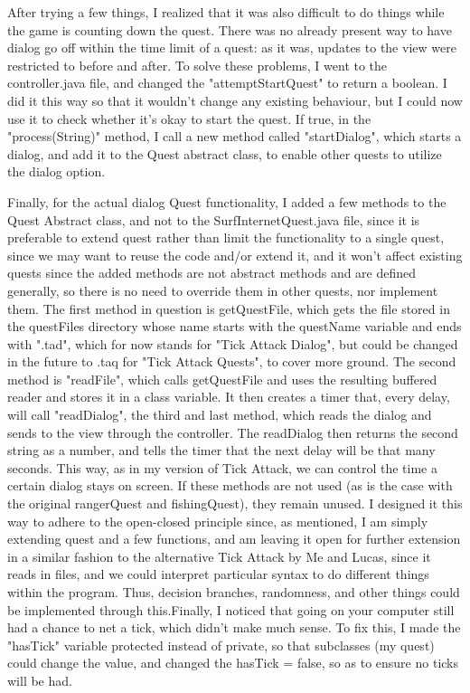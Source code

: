 \documentclass[letter paper, 12pt]{article}
\begin{document}
After trying a few things, I realized that it was also difficult to do things while the game is counting down the quest. There was no already present way to have dialog go off within the time limit of a quest: as it was, updates to the view were restricted to before and after. To solve these problems, I went to the controller.java file, and changed the "attemptStartQuest" to return a boolean. I did it this way so that it wouldn't change any existing behaviour, but I could now use it to check whether it's okay to start the quest. If true, in the "process(String)" method, I call a new method called "startDialog", which starts a dialog, and add it to the Quest abstract class, to enable other quests to utilize the dialog option.\newline

Finally, for the actual dialog Quest functionality, I added a few methods to the Quest Abstract class, and not to the SurfInternetQuest.java file, since it is preferable to extend quest rather than limit the functionality to a single quest, since we may want to reuse the code and/or extend it, and it won't affect existing quests since the added methods are not abstract methods and are defined generally, so there is no need to override them in other quests, nor implement them. The first method in question is getQuestFile, which gets the file stored in the questFiles directory whose name starts with the questName variable and ends with ".tad", which for now stands for "Tick Attack Dialog", but could be changed in the future to .taq for "Tick Attack Quests", to cover more ground. The second method is "readFile", which calls getQuestFile and uses the resulting buffered reader and stores it in a class variable. It then creates a timer that, every delay, will call "readDialog", the third and last method, which reads the dialog and sends to the view through the controller. The readDialog then returns the second string as a number, and tells the timer that the next delay will be that many seconds. This way, as in my version of Tick Attack, we can control the time a certain dialog stays on screen. If these methods are not used (as is the case with the original rangerQuest and fishingQuest), they remain unused. I designed it this way to adhere to the open-closed principle since, as mentioned, I am simply extending quest and a few functions, and am leaving it open for further extension in a similar fashion to the alternative Tick Attack by Me and Lucas, since it reads in files, and we could interpret particular syntax to do different things within the program. Thus, decision branches, randomness, and other things could be implemented through this.Finally, I noticed that going on your computer still had a chance to net a tick, which didn't make much sense. To fix this, I made the "hasTick" variable protected instead of private, so that subclasses (my quest) could change the value, and changed the hasTick = false, so as to ensure no ticks will be had.\newline
\end{document}
